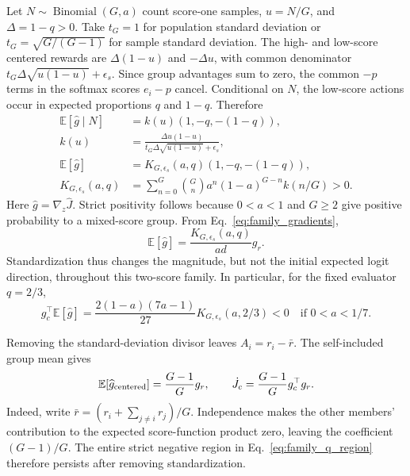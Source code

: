 \documentclass[11pt]{article}
\newcommand{\E}{\mathbb E}
\begin{document}
Let $N\sim\operatorname{Binomial}(G,a)$ count score-one samples, $u=N/G$, and $\Delta=1-q>0$. Take $t_G=1$ for population standard deviation or $t_G=\sqrt{G/(G-1)}$ for sample standard deviation. The high- and low-score centered rewards are $\Delta(1-u)$ and $-\Delta u$, with common denominator
$t_G\Delta\sqrt{u(1-u)}+\epsilon_s$.
Since group advantages sum to zero, the common $-p$ terms in the softmax scores $e_i-p$ cancel. Conditional on $N$, the low-score actions occur in expected proportions $q$ and $1-q$. Therefore
\begin{align}
\E[\widehat g\mid N]&=k(u)(1,-q,-(1-q)),\nonumber\\
k(u)&=\frac{\Delta u(1-u)}{t_G\Delta\sqrt{u(1-u)}+\epsilon_s},\nonumber\\
\E[\widehat g]&=K_{G,\epsilon_s}(a,q)(1,-q,-(1-q)),\label{eq:family_gspo_direction}\\
K_{G,\epsilon_s}(a,q)&=\sum_{n=0}^G {G\choose n}a^n(1-a)^{G-n}k(n/G)>0.\nonumber
\end{align}
Here $\widehat g=\nabla_z\widehat J$. Strict positivity follows because $0<a<1$ and $G\geq2$ give positive probability to a mixed-score group. From Eq.~\eqref{eq:family_gradients},
\begin{equation}
\E[\widehat g]=\frac{K_{G,\epsilon_s}(a,q)}{ad}g_r.
\label{eq:family_gspo_collinear}
\end{equation}
Standardization thus changes the magnitude, but not the initial expected logit direction, throughout this two-score family. In particular, for the fixed evaluator $q=2/3$,
\begin{equation}
g_c^\top\E[\widehat g]
=\frac{2(1-a)(7a-1)}{27}K_{G,\epsilon_s}(a,2/3)<0
\quad\text{if }0<a<1/7.
\label{eq:family_gspo_fixed_q}
\end{equation}

Removing the standard-deviation divisor leaves $A_i=r_i-\bar r$. The self-included group mean gives
\begin{equation}
\E[\widehat g_{\rm centered}]=\frac{G-1}{G}g_r,
\qquad
\dot J_c=\frac{G-1}{G}g_c^\top g_r.
\label{eq:sweno}
\end{equation}
Indeed, write $\bar r=(r_i+\sum_{j\ne i}r_j)/G$. Independence makes the other members' contribution to the expected score-function product zero, leaving the coefficient $(G-1)/G$. The entire strict negative region in Eq.~\eqref{eq:family_q_region} therefore persists after removing standardization.
\end{document}
